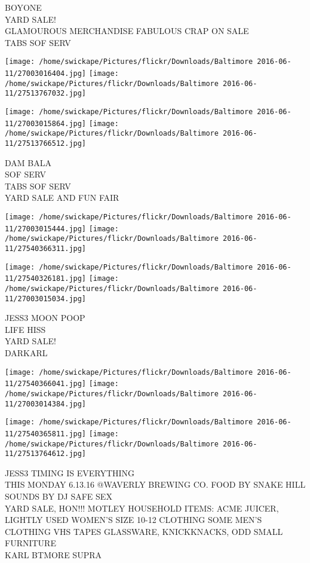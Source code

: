 \documentclass[10pt,letterpaper]{article}
\begin{document}
BOYONE\\
YARD SALE!\\
GLAMOUROUS MERCHANDISE FABULOUS CRAP ON SALE\\
TABS SOF SERV
\pagebreak

\texttt{[image: /home/swickape/Pictures/flickr/Downloads/Baltimore 2016-06-11/27003016404.jpg]}
\texttt{[image: /home/swickape/Pictures/flickr/Downloads/Baltimore 2016-06-11/27513767032.jpg]}

\texttt{[image: /home/swickape/Pictures/flickr/Downloads/Baltimore 2016-06-11/27003015864.jpg]}
\texttt{[image: /home/swickape/Pictures/flickr/Downloads/Baltimore 2016-06-11/27513766512.jpg]}

DAM BALA\\
SOF SERV\\
TABS SOF SERV\\
YARD SALE AND FUN FAIR
\pagebreak

\texttt{[image: /home/swickape/Pictures/flickr/Downloads/Baltimore 2016-06-11/27003015444.jpg]}
\texttt{[image: /home/swickape/Pictures/flickr/Downloads/Baltimore 2016-06-11/27540366311.jpg]}

\texttt{[image: /home/swickape/Pictures/flickr/Downloads/Baltimore 2016-06-11/27540326181.jpg]}
\texttt{[image: /home/swickape/Pictures/flickr/Downloads/Baltimore 2016-06-11/27003015034.jpg]}

JESS3 MOON POOP\\
LIFE HISS\\
YARD SALE!\\
DARKARL
\pagebreak

\texttt{[image: /home/swickape/Pictures/flickr/Downloads/Baltimore 2016-06-11/27540366041.jpg]}
\texttt{[image: /home/swickape/Pictures/flickr/Downloads/Baltimore 2016-06-11/27003014384.jpg]}

\texttt{[image: /home/swickape/Pictures/flickr/Downloads/Baltimore 2016-06-11/27540365811.jpg]}
\texttt{[image: /home/swickape/Pictures/flickr/Downloads/Baltimore 2016-06-11/27513764612.jpg]}

JESS3 TIMING IS EVERYTHING\\
THIS MONDAY 6.13.16 @WAVERLY BREWING CO. FOOD BY SNAKE HILL SOUNDS BY DJ SAFE SEX\\
YARD SALE, HON!!! MOTLEY HOUSEHOLD ITEMS: ACME JUICER, LIGHTLY USED WOMEN'S SIZE 10{-}12 CLOTHING SOME MEN'S CLOTHING VHS TAPES GLASSWARE, KNICKKNACKS, ODD SMALL FURNITURE\\
KARL BTMORE SUPRA
\pagebreak
\end{document}
